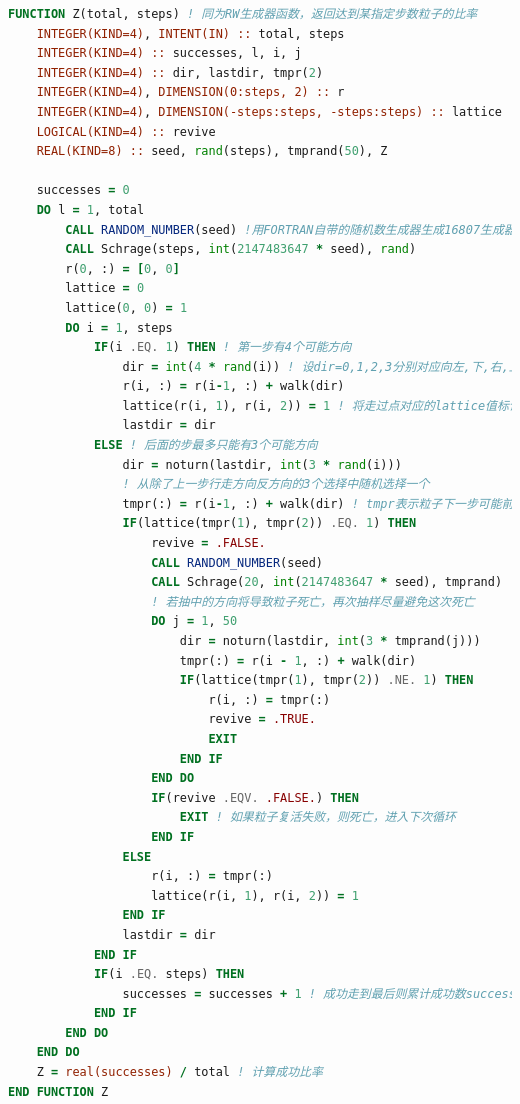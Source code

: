 \documentclass[12pt,a4paper,utf8]{ctexart}
\begin{document}
\begin{framed}
\begin{lstlisting}[language=Fortran]
FUNCTION Z(total, steps) ! 同为RW生成器函数，返回达到某指定步数粒子的比率
    INTEGER(KIND=4), INTENT(IN) :: total, steps
    INTEGER(KIND=4) :: successes, l, i, j
    INTEGER(KIND=4) :: dir, lastdir, tmpr(2)
    INTEGER(KIND=4), DIMENSION(0:steps, 2) :: r
    INTEGER(KIND=4), DIMENSION(-steps:steps, -steps:steps) :: lattice
    LOGICAL(KIND=4) :: revive
    REAL(KIND=8) :: seed, rand(steps), tmprand(50), Z

    successes = 0
    DO l = 1, total
        CALL RANDOM_NUMBER(seed) !用FORTRAN自带的随机数生成器生成16807生成器的种子
        CALL Schrage(steps, int(2147483647 * seed), rand)
        r(0, :) = [0, 0]
        lattice = 0
        lattice(0, 0) = 1
        DO i = 1, steps
            IF(i .EQ. 1) THEN ! 第一步有4个可能方向
                dir = int(4 * rand(i)) ! 设dir=0,1,2,3分别对应向左,下,右,上
                r(i, :) = r(i-1, :) + walk(dir)
                lattice(r(i, 1), r(i, 2)) = 1 ! 将走过点对应的lattice值标记为1
                lastdir = dir
            ELSE ! 后面的步最多只能有3个可能方向
                dir = noturn(lastdir, int(3 * rand(i)))
                ! 从除了上一步行走方向反方向的3个选择中随机选择一个
                tmpr(:) = r(i-1, :) + walk(dir) ! tmpr表示粒子下一步可能前往的位置
                IF(lattice(tmpr(1), tmpr(2)) .EQ. 1) THEN
                    revive = .FALSE.
                    CALL RANDOM_NUMBER(seed) 
                    CALL Schrage(20, int(2147483647 * seed), tmprand)
                    ! 若抽中的方向将导致粒子死亡，再次抽样尽量避免这次死亡
                    DO j = 1, 50
                        dir = noturn(lastdir, int(3 * tmprand(j)))
                        tmpr(:) = r(i - 1, :) + walk(dir)
                        IF(lattice(tmpr(1), tmpr(2)) .NE. 1) THEN
                            r(i, :) = tmpr(:)
                            revive = .TRUE.
                            EXIT
                        END IF
                    END DO
                    IF(revive .EQV. .FALSE.) THEN
                        EXIT ! 如果粒子复活失败，则死亡，进入下次循环
                    END IF
                ELSE
                    r(i, :) = tmpr(:)
                    lattice(r(i, 1), r(i, 2)) = 1
                END IF
                lastdir = dir
            END IF
            IF(i .EQ. steps) THEN
                successes = successes + 1 ! 成功走到最后则累计成功数successes
            END IF
        END DO
    END DO
    Z = real(successes) / total ! 计算成功比率
END FUNCTION Z


\end{lstlisting}
\end{framed}
\end{document}
